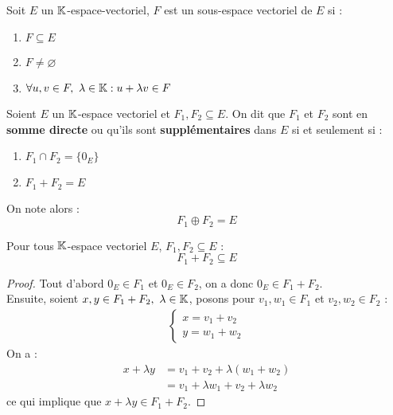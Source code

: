 \begin{definition}
	Soit $E$ un $\mathbb{K}$-espace-vectoriel, $F$ est un sous-espace vectoriel de $E$ si :
	\begin{enumerate}
    		\item $F \subseteq E$
    		\item $F \neq \varnothing$
    		\item $\forall u, v \in F,\ \lambda \in \mathbb{K} : u + \lambda v \in F$
    	\end{enumerate}
\end{definition}

\begin{definition}
	Soient $E$ un $\mathbb{K}$-espace vectoriel et $F_1, F_2 \subseteq E$. On dit que $F_1$ et $F_2$ sont en \textbf{somme directe} ou qu'ils sont \textbf{supplémentaires} dans $E$ si et seulement si :
	\begin{multicols}{2}
	    \begin{enumerate}
		\item $F_1 \cap F_2 = \{ 0_E \}$
		\item $F_1 + F_2 = E$
	\end{enumerate}
	\end{multicols}
	On note alors :
	\[ F_1 \oplus F_2 = E \]
\end{definition}

\begin{proposition}
	Pour tous $\mathbb{K}$-espace vectoriel $E$, $F_1, F_2 \subseteq E$ :
	 \[ F_1 + F_2 \subseteq E \]
\end{proposition}

\begin{proof}
	Tout d'abord $0_E \in F_1$ et $0_E \in F_2$, on a donc $0_E \in F_1 + F_2$.
	\\
	Ensuite, soient $x, y \in F_1 + F_2,\ \lambda \in \mathbb{K}$, posons pour $v_1, w_1 \in F_1$ et $v_2, w_2 \in F_2$ :
	\begin{align*}
		\begin{cases}
			x = v_1 + v_2 \\
			y = w_1 + w_2
		\end{cases}
	\end{align*}
	On a :
	\begin{align*}
		x + \lambda y &= v_1 + v_2 + \lambda (w_1 + w_2) \\
		&= v_1 + \lambda w_1 + v_2 + \lambda w_2
	\end{align*}
	ce qui implique que $x + \lambda y \in F_1 + F_2$.
\end{proof}


